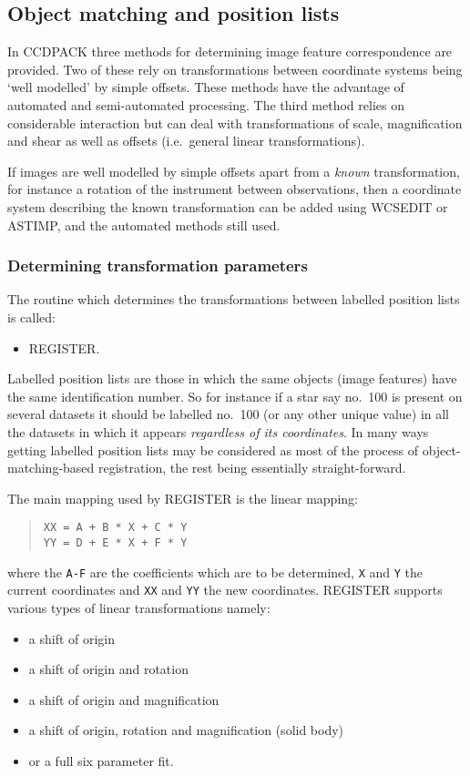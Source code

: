 \documentclass[twoside,11pt]{article}
\newcommand{\htmlref}[2]{#1}
\newcommand{\latexhtml}[2]{#1}
\newcommand{\xlabel}[1]{}
\renewcommand{\_}{\texttt{\symbol{95}}}
\newcommand{\ttsize}{\latexhtml{\small}{}}
\newenvironment{myquote}{\begin{quote}\ttsize}{\end{quote}}
\newcommand{\text}[1]{{\ttsize \tt #1}}
\newcommand{\routine}[1]{{\sc #1}}
\newcommand{\xroutine}[1]{\htmlref{{\sc #1}}{#1}}
\begin{document}
\subsection{\xlabel{objectmatching}\label{object_matching}Object matching 
            and position lists}

In CCDPACK three methods for determining image feature correspondence
are provided. Two of these rely on transformations between 
coordinate systems being
`well modelled' by simple offsets. These methods have the advantage of
automated and semi-automated processing. The third method relies on
considerable interaction but can deal with transformations of scale,
magnification and shear as well as offsets (i.e.\ general linear
transformations).

If images are well modelled by simple offsets apart from a 
{\em known} transformation, for instance a rotation of the
instrument between observations, then a coordinate system 
describing the known
transformation can be added using \xroutine{WCSEDIT} or \xroutine{ASTIMP},
and the automated methods still used.


\subsubsection{\xlabel{registration}\label{registration}Determining 
               transformation parameters}

The routine which determines the transformations between labelled
position lists is called:
\begin{itemize}
\item \xroutine{REGISTER}.
\end{itemize}
Labelled position lists are those in which the same objects (image
features) have the same identification number. So for instance if a
star say no.\ 100 is present on several datasets it should be labelled
no.\ 100 (or any other unique value) in all the datasets in which it
appears {\em regardless of its coordinates}. In many ways getting
labelled position lists may be considered as most of the process of
object-matching-based registration, 
the rest being essentially straight-forward.

The main mapping used by \routine{REGISTER} is the linear mapping:
\begin{myquote}
\begin{verbatim}
XX = A + B * X + C * Y
YY = D + E * X + F * Y
\end{verbatim}
\end{myquote}
where the \text{A-F} are the coefficients which are to be
determined, \text{X} and \text{Y} the current coordinates and
\text{XX} and \text{YY} the new coordinates. \routine{REGISTER} supports
various types of linear transformations namely:
\begin{itemize}
\item a shift of origin
\item a shift of origin and rotation
\item a shift of origin and magnification
\item a shift of origin, rotation and magnification (solid body)
\item or a full six parameter fit.
\end{itemize}
\end{document}
